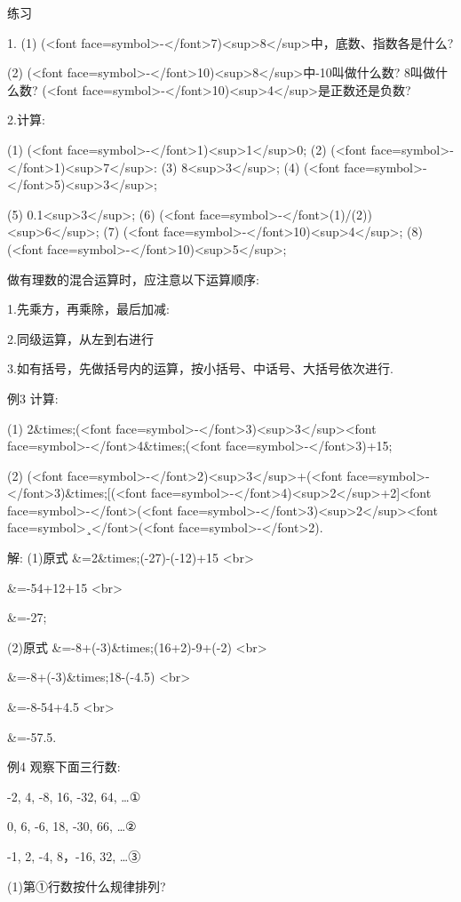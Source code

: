 \endexample

\beginexercise
练习

1. (1) (<font face=symbol>-</font>7)<sup>8</sup>中，底数、指数各是什么?

(2) (<font face=symbol>-</font>10)<sup>8</sup>中-10叫做什么数? 8叫做什么数? (<font face=symbol>-</font>10)<sup>4</sup>是正数还是负数?

2.计算:

(1) (<font face=symbol>-</font>1)<sup>1</sup>0;  (2) (<font face=symbol>-</font>1)<sup>7</sup>:  (3) 8<sup>3</sup>;  (4) (<font face=symbol>-</font>5)<sup>3</sup>;

(5) 0.1<sup>3</sup>;    (6) (<font face=symbol>-</font>(1)/(2))<sup>6</sup>; (7) (<font face=symbol>-</font>10)<sup>4</sup>; (8) (<font face=symbol>-</font>10)<sup>5</sup>;
\endexercise

做有理数的混合运算时，应注意以下运算顺序:

1.先乘方，再乘除，最后加减:

2.同级运算，从左到右进行

3.如有括号，先做括号内的运算，按小括号、中话号、大括号依次进行.

\beginexample

例3 计算:

(1) 2&times;(<font face=symbol>-</font>3)<sup>3</sup><font face=symbol>-</font>4&times;(<font face=symbol>-</font>3)+15;

(2) (<font face=symbol>-</font>2)<sup>3</sup>+(<font face=symbol>-</font>3)&times;[(<font face=symbol>-</font>4)<sup>2</sup>+2]<font face=symbol>-</font>(<font face=symbol>-</font>3)<sup>2</sup><font face=symbol>¸</font>(<font face=symbol>-</font>2).

解: (1)原式\beginalign
        &=2&times;(-27)-(-12)+15 <br>

        &=-54+12+15     <br>

        &=-27;
\endalign

(2)原式\beginalign
    &=-8+(-3)&times;(16+2)-9+(-2) <br>

    &=-8+(-3)&times;18-(-4.5) <br>

    &=-8-54+4.5 <br>

    &=-57.5.
    \endalign

例4 观察下面三行数:

-2, 4, -8, 16, -32, 64, \dots ①

0, 6, -6, 18, -30, 66, \dots  ②

-1, 2, -4, 8，-16, 32, \dots  ③

(1)第①行数按什么规律排列?

